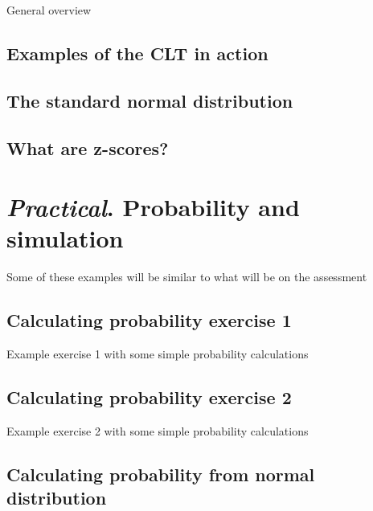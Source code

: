 \documentclass[
]{book}
\begin{document}
General overview

\hypertarget{examples-of-the-clt-in-action}{%
\section{Examples of the CLT in action}\label{examples-of-the-clt-in-action}}

\hypertarget{the-standard-normal-distribution}{%
\section{The standard normal distribution}\label{the-standard-normal-distribution}}

\hypertarget{what-are-z-scores}{%
\section{What are z-scores?}\label{what-are-z-scores}}

\hypertarget{practical.-probability-and-simulation}{%
\chapter{\texorpdfstring{\emph{Practical}. Probability and simulation}{Practical. Probability and simulation}}\label{practical.-probability-and-simulation}}

Some of these examples will be similar to what will be on the assessment

\hypertarget{calculating-probability-exercise-1}{%
\section{Calculating probability exercise 1}\label{calculating-probability-exercise-1}}

Example exercise 1 with some simple probability calculations

\hypertarget{calculating-probability-exercise-2}{%
\section{Calculating probability exercise 2}\label{calculating-probability-exercise-2}}

Example exercise 2 with some simple probability calculations

\hypertarget{calculating-probability-from-normal-distribution}{%
\section{Calculating probability from normal distribution}\label{calculating-probability-from-normal-distribution}}
\end{document}
